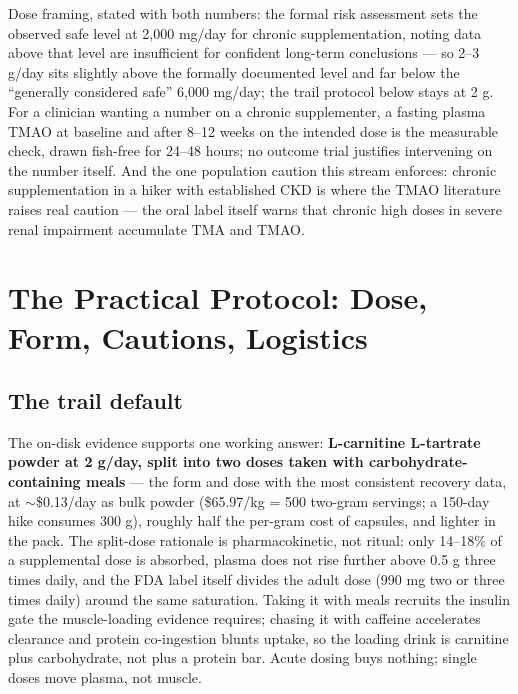 Dose framing, stated with both numbers: the formal risk assessment sets the observed safe level at 2{,}000 mg/day for chronic supplementation, noting data above that level are insufficient for confident long-term conclusions --- so 2--3 g/day sits slightly above the formally documented level and far below the ``generally considered safe'' 6{,}000 mg/day; the trail protocol below stays at 2 g. For a clinician wanting a number on a chronic supplementer, a fasting plasma TMAO at baseline and after 8--12 weeks on the intended dose is the measurable check, drawn fish-free for 24--48 hours; no outcome trial justifies intervening on the number itself. And the one population caution this stream enforces: chronic supplementation in a hiker with established CKD is where the TMAO literature raises real caution --- the oral label itself warns that chronic high doses in severe renal impairment accumulate TMA and TMAO.

\section{The Practical Protocol: Dose, Form, Cautions, Logistics}
\label{sec:practical}

\subsection{The trail default}

The on-disk evidence supports one working answer: \textbf{L-carnitine L-tartrate powder at 2 g/day, split into two doses taken with carbohydrate-containing meals} --- the form and dose with the most consistent recovery data, at $\sim$\$0.13/day as bulk powder (\$65.97/kg = 500 two-gram servings; a 150-day hike consumes 300 g), roughly half the per-gram cost of capsules, and lighter in the pack. The split-dose rationale is pharmacokinetic, not ritual: only 14--18\% of a supplemental dose is absorbed, plasma does not rise further above 0.5 g three times daily, and the FDA label itself divides the adult dose (990 mg two or three times daily) around the same saturation. Taking it with meals recruits the insulin gate the muscle-loading evidence requires; chasing it with caffeine accelerates clearance and protein co-ingestion blunts uptake, so the loading drink is carnitine plus carbohydrate, not plus a protein bar. Acute dosing buys nothing; single doses move plasma, not muscle.

